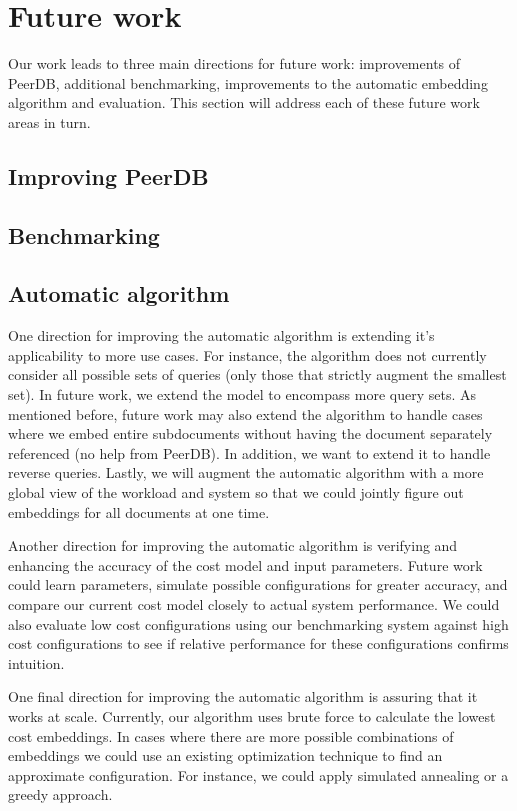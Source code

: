 \section{Future work}
Our work leads to three main directions for future work: improvements of PeerDB, additional benchmarking, improvements to the automatic embedding algorithm and evaluation.
This section will address each of these future work areas in turn.

\subsection{Improving PeerDB}

\subsection{Benchmarking}

\subsection{Automatic algorithm}
One direction for improving the automatic algorithm is extending it's applicability to more use cases. For instance, the algorithm does not currently consider all possible sets of queries (only those that strictly augment the smallest set). In future work, we extend the model to encompass more query sets. As mentioned before, future work may also extend the algorithm to handle cases where we embed entire subdocuments without having the document separately referenced (no help from PeerDB). In addition, we want to extend it to handle reverse queries. Lastly, we will augment the automatic algorithm with a more global view of the workload and system so that we could jointly figure out embeddings for all documents at one time.

Another direction for improving the automatic algorithm is verifying and enhancing the accuracy of the cost model and input parameters. 
Future work could learn parameters, simulate possible configurations for greater accuracy, and compare our current cost model closely to actual system performance. 
We could also evaluate low cost configurations using our benchmarking system against high cost configurations to see if relative performance for these configurations confirms intuition.

One final direction for improving the automatic algorithm is assuring that it works at scale. Currently, our algorithm uses brute force to calculate the lowest cost embeddings. In cases where there are more possible combinations of embeddings we could use an existing optimization technique to find an approximate configuration. For instance, we could apply simulated annealing or a greedy approach.
